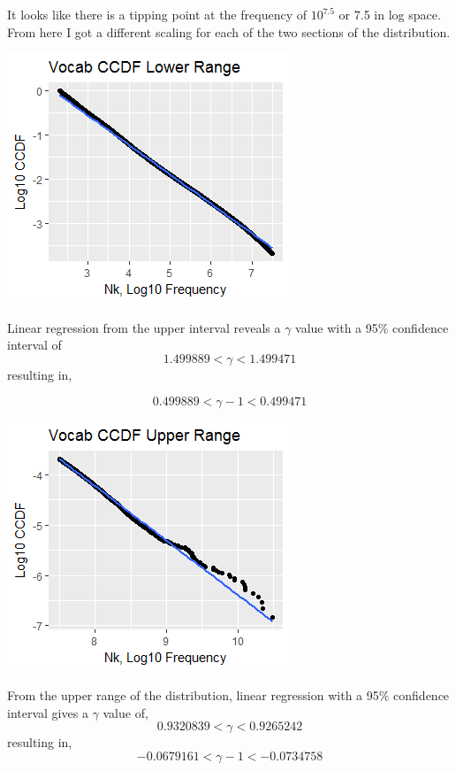 It looks like there is a tipping point at the frequency of $10^{7.5}$ or 7.5 in log space. From here I got a different scaling for each of the two sections of the distribution.

\includegraphics{Problem2_lower_range.png}

Linear regression from the upper interval reveals a $\gamma$ value with a 95\% confidence interval of
$$
    1.499889 < \gamma < 1.499471
$$
resulting in,

$$
    0.499889 < \gamma - 1 < 0.499471
$$

\includegraphics{Problem2_upper_range.png}

From the upper range of the distribution, linear regression with a 95\% confidence interval gives a $\gamma$ value of,
$$
    0.9320839 < \gamma < 0.9265242
$$
resulting in,
$$
    -0.0679161 < \gamma - 1 < -0.0734758
$$
